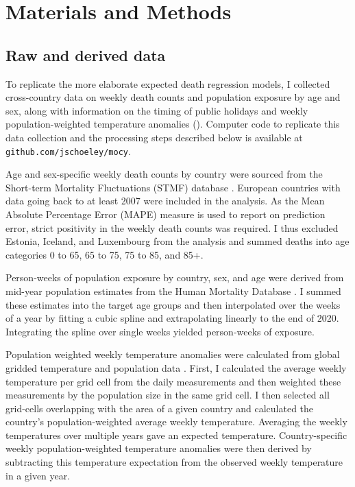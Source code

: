 \documentclass[10pt,letterpaper]{article}
\begin{document}
\section*{Materials and Methods}

\subsection*{Raw and derived data}

To replicate the more elaborate expected death regression models, I collected cross-country data on weekly death counts and population exposure by age and sex, along with information on the timing of public holidays and weekly population-weighted temperature anomalies (). Computer code to replicate this data collection and the processing steps described below is available at \texttt{github.com/jschoeley/mocy}.


Age and sex-specific weekly death counts by country were sourced from the Short-term Mortality Fluctuations (STMF) database \cite{Jdanov2021, Nemeth2021}. European countries with data going back to at least 2007 were included in the analysis. As the Mean Absolute Percentage Error (MAPE) measure is used to report on prediction error, strict positivity in the weekly death counts was required. I thus excluded Estonia, Iceland, and Luxembourg from the analysis and summed deaths into age categories 0 to 65, 65 to 75, 75 to 85, and 85+.


Person-weeks of population exposure by country, sex, and age were derived from mid-year population estimates from the Human Mortality Database \cite{HMD2021}. I summed these estimates into the target age groups and then interpolated over the weeks of a year by fitting a cubic spline and extrapolating linearly to the end of 2020. Integrating the spline over single weeks yielded person-weeks of exposure.


Population weighted weekly temperature anomalies were calculated from global gridded temperature \cite{CPC2021} and population data \cite{CIESIN2018}. First, I calculated the average weekly temperature per grid cell from the daily measurements and then weighted these measurements by the population size in the same grid cell. I then selected all grid-cells overlapping with the area of a given country and calculated the country's population-weighted average weekly temperature. Averaging the weekly temperatures over multiple years gave an expected temperature. Country-specific weekly population-weighted temperature anomalies were then derived by subtracting this temperature expectation from the observed weekly temperature in a given year.
\end{document}
